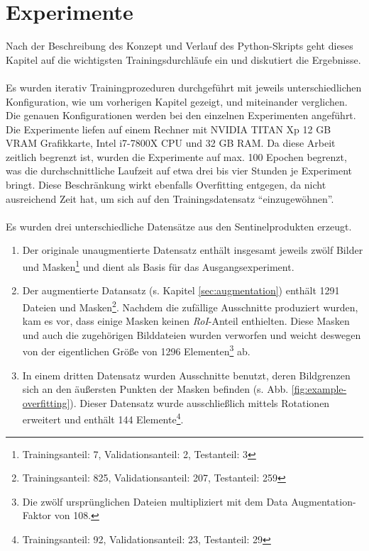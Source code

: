 \chapter{Experimente}\label{chap:experiments}

Nach der Beschreibung des Konzept und Verlauf des Python-Skripts geht dieses Kapitel auf die wichtigsten Trainingsdurchläufe ein und diskutiert die Ergebnisse. 
\\\\
Es wurden iterativ Trainingprozeduren durchgeführt mit jeweils unterschiedlichen Konfiguration, wie um vorherigen Kapitel gezeigt, und miteinander verglichen. Die genauen Konfigurationen werden bei den einzelnen Experimenten angeführt. Die Experimente liefen auf einem Rechner mit NVIDIA TITAN Xp 12 GB VRAM Grafikkarte, Intel i7-7800X CPU und 32 GB RAM. Da diese Arbeit zeitlich begrenzt ist, wurden die Experimente auf max. 100 Epochen begrenzt, was die durchschnittliche Laufzeit auf etwa drei bis vier Stunden je Experiment bringt. Diese Beschränkung wirkt ebenfalls Overfitting entgegen, da nicht ausreichend Zeit hat, um sich auf den Trainingsdatensatz "`einzugewöhnen"'.
\\\\
Es wurden drei unterschiedliche Datensätze aus den Sentinelprodukten erzeugt. 
\begin{enumerate}
	\item Der originale unaugmentierte Datensatz enthält insgesamt jeweils zwölf Bilder und Masken\footnote{Trainingsanteil: 7, Validationsanteil: 2, Testanteil: 3} und dient als Basis für das Ausgangsexperiment. 
	\item Der augmentierte Datansatz (s. Kapitel \ref{sec:augmentation}) enthält 1291 Dateien und Masken\footnote{Trainingsanteil: 825, Validationsanteil: 207, Testanteil: 259}. Nachdem die zufällige Ausschnitte produziert wurden, kam es vor, dass einige Masken keinen \textit{RoI}-Anteil enthielten. Diese Masken und auch die zugehörigen Bilddateien wurden verworfen und weicht deswegen von der eigentlichen Größe von 1296 Elementen\footnote{Die zwölf ursprünglichen Dateien multipliziert mit dem Data Augmentation-Faktor von 108.} ab.
	\item In einem dritten Datensatz wurden Ausschnitte benutzt, deren Bildgrenzen sich an den äußersten Punkten der Masken befinden (s. Abb. \ref{fig:example-overfitting}). Dieser Datensatz wurde ausschließlich mittels Rotationen erweitert und enthält 144 Elemente\footnote{Trainingsanteil: 92, Validationsanteil: 23, Testanteil: 29}. 
\end{enumerate}
\noindent

